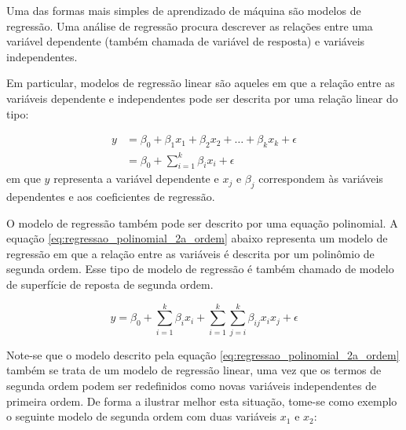 \documentclass[brazil,tf,epusp]{usp}  %
\begin{document}


Uma das formas mais simples de aprendizado de máquina são modelos de regressão. Uma análise de regressão procura descrever as relações entre uma variável dependente (também chamada de variável de resposta) e variáveis independentes.

Em particular, modelos de regressão linear são aqueles em que a relação entre as variáveis dependente e independentes pode ser descrita por uma relação linear do tipo:

\begin{align}
  y &= \beta_0 + \beta_1 x_1 + \beta_2 x_2 + \dots + \beta_k x_k + \epsilon \nonumber \\
    &= \beta_0 + \sum_{i=1}^k \beta_i x_i + \epsilon
  \label{eq:regressao_linear}
\end{align}
%
em que $y$ representa a variável dependente e $x_j$ e $\beta_j$ correspondem às variáveis dependentes e aos coeficientes de regressão.

O modelo de regressão também pode ser descrito por uma equação polinomial. A equação \ref{eq:regressao_polinomial_2a_ordem} abaixo representa um modelo de regressão em que a relação entre as variáveis é descrita por um polinômio de segunda ordem. Esse tipo de modelo de regressão é também chamado de modelo de superfície de reposta de segunda ordem.

\begin{equation}
  y = \beta_0 + \sum_{i=1}^k \beta_i x_i + \sum_{i=1}^{k} \sum_{j=i}^k \beta_{ij} x_i x_j + \epsilon
  \label{eq:regressao_polinomial_2a_ordem}
\end{equation}

Note-se que o modelo descrito pela equação \ref{eq:regressao_polinomial_2a_ordem} também se trata de um modelo de regressão linear, uma vez que os termos de segunda ordem podem ser redefinidos como novas variáveis independentes de primeira ordem. De forma a ilustrar melhor esta situação, tome-se como exemplo o seguinte modelo de segunda ordem com duas variáveis $x_1$ e $x_2$:
\end{document}
